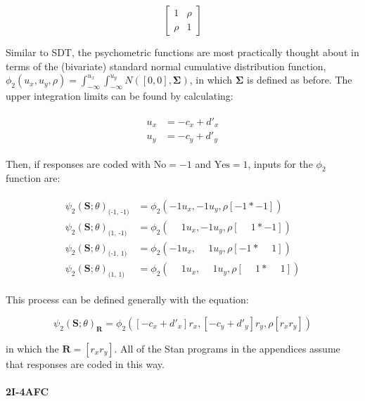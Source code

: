 \documentclass{article}\usepackage{knitr}
\begin{document}
$$
\begin{bmatrix}
1 & \rho \\
\rho & 1
\end{bmatrix}
$$

Similar to SDT, the psychometric functions are most practically thought about in terms of the (bivariate) standard normal cumulative distribution function, $\phi_2(u_x, u_y, \rho) = \int_{-\infty}^{u_x} \int_{-\infty}^{u_y} N([0,0], \bm{\Sigma})$, in which $\bm{\Sigma}$ is defined as before. The upper integration limits can be found by calculating:

\begin{align*}
\begin{split}
u_x &= -c_x + d'_x \\
u_y &= -c_y + d'_y
\end{split}
\end{align*}

Then, if responses are coded with $\text{No} = -1$ and $ \text{Yes} = 1$, inputs for the $\phi_2$ function are:

\begin{align*}
\begin{split}
\psi_2(\bm{S}; \theta)_{\text{(-1, -1)}} &= \phi_2(-1 u_x, -1 u_y, \rho [-1 * -1]) \\
\psi_2(\bm{S}; \theta)_{\text{(1, -1)}}  &= \phi_2(\phantom{-}1 u_x, -1 u_y, \rho [\phantom{-}1 * -1]) \\
\psi_2(\bm{S}; \theta)_{\text{(-1, 1)}}  &= \phi_2(-1 u_x, \phantom{-}1 u_y, \rho [-1 * \phantom{-}1]) \\
\psi_2(\bm{S}; \theta)_{\text{(1, 1)}}   &= \phi_2(\phantom{-}1 u_x, \phantom{-}1 u_y, \rho [\phantom{-}1 * \phantom{-}1]) 
\end{split}
\end{align*}

This process can be defined generally with the equation:

\begin{equation}
\psi_2(\bm{S}; \theta)_{\bm{R}} = \phi_2([-c_x + d'_x]r_x, [-c_y + d'_y] r_y, \rho [r_x r_y])
\label{eq:generalPfun}
\end{equation}

in which the $\bm{R} = [r_x r_y]$. All of the Stan \citep{stan2019} programs in the appendices assume that responses are coded in this way.

\paragraph{2I-4AFC}
\end{document}
